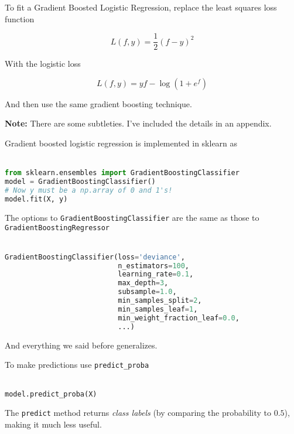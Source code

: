 %
\begin{frame}
To fit a Gradient Boosted Logistic Regression, replace the least squares loss function

$$ L(f, y) = \frac{1}{2} \left(f - y \right)^2 $$

With the logistic loss

$$ L(f, y) = y f - \log(1 + e^f) $$

And then use the same gradient boosting technique.

\end{frame}
%
\begin{frame}
\textbf{Note:} There are some subtleties.  I've included the details in an appendix.
\end{frame}
%
\begin{frame}[fragile]
Gradient boosted logistic regression is implemented in sklearn as\\~\\

\begin{lstlisting}[language=python]
from sklearn.ensembles import GradientBoostingClassifier
model = GradientBoostingClassifier()
# Now y must be a np.array of 0 and 1's!
model.fit(X, y)
\end{lstlisting}
\end{frame}
%
\begin{frame}[fragile]
The options to \texttt{GradientBoostingClassifier} are the same as those to \texttt{GradientBoostingRegressor}\\~\\

\begin{lstlisting}[language=python]
GradientBoostingClassifier(loss='deviance',
                           n_estimators=100, 
                           learning_rate=0.1, 
                           max_depth=3,
                           subsample=1.0, 
                           min_samples_split=2, 
                           min_samples_leaf=1, 
                           min_weight_fraction_leaf=0.0,
                           ...)
\end{lstlisting}

And everything we said before generalizes.
\end{frame}
%
\begin{frame}[fragile]
To make predictions use \texttt{predict\_proba}\\~\\

\begin{lstlisting}[language=python]
model.predict_proba(X)
\end{lstlisting}

The \texttt{predict} method returns \textit{class labels} (by comparing the probability to $0.5$), making it much less useful.
\end{frame}
